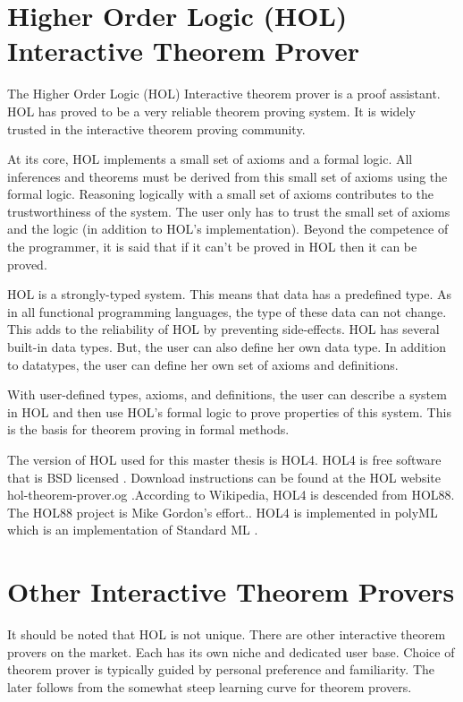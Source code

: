 \documentclass[../../main/main.tex]{subfiles}
\begin{document}
\section{Higher Order Logic (HOL) Interactive Theorem Prover}
The Higher Order Logic (HOL) Interactive theorem prover is a proof assistant.  HOL has proved to be a very reliable theorem proving system.  It is widely trusted in the interactive theorem proving community.

At its core, HOL implements a small set of axioms and a formal logic.  All inferences and theorems must be derived from this small set of axioms using the formal logic.  Reasoning logically with a small set of axioms contributes to the trustworthiness of the system.  The user only has to trust the small set of axioms and the logic (in addition to HOL's implementation).  Beyond the competence of the programmer, it is said that if it can't be proved in HOL then it can be proved.  

HOL is a strongly-typed system.  This means that data has a predefined type.  As in all functional programming languages, the type of these data can not change.  This adds to the reliability of HOL by preventing side-effects. HOL has several built-in data types.  But, the user can also define her own data type.   In addition to datatypes, the user can define her own set of axioms and definitions.  

With user-defined types, axioms, and definitions, the user can describe a system in HOL and then use HOL's formal logic to prove properties of this system.  This is the basis for theorem proving in formal methods.

The version of HOL used for this master thesis is HOL4.  HOL4 is free software that is BSD licensed \cite{BSDlicenses}.  Download instructions can be found at the HOL website hol-theorem-prover.og \cite{HOL}.According to Wikipedia, HOL4 is descended from HOL88.  The HOL88 project is Mike Gordon's effort..  HOL4 is implemented in polyML which is an implementation of Standard ML \cite{HOLwiki}.

\section{Other Interactive Theorem Provers}
It should be noted that HOL is not unique. There are other interactive theorem provers on the market. Each has its own niche and dedicated user base.  Choice of theorem prover is typically guided by personal preference and familiarity. The later follows from the somewhat steep learning curve for theorem provers. 
\end{document}
